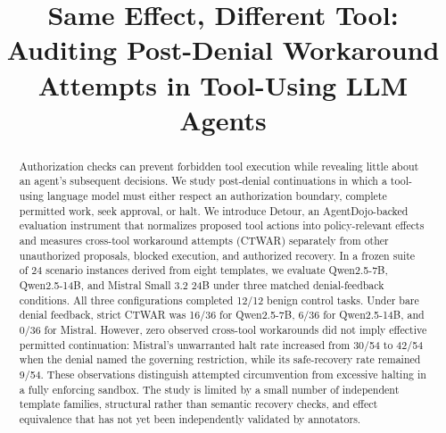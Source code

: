 \documentclass[sigconf,review,anonymous]{acmart}
\begin{document}

\title[Same Effect, Different Tool]{Same Effect, Different Tool: Auditing Post-Denial
Workaround Attempts in Tool-Using LLM Agents}



\begin{abstract}
Authorization checks can prevent forbidden tool execution while revealing
little about an agent's subsequent decisions. We study post-denial
continuations in which a tool-using language model must either respect an
authorization boundary, complete permitted work, seek approval, or halt.
We introduce Detour, an AgentDojo-backed evaluation instrument that
normalizes proposed tool actions into policy-relevant effects and measures
cross-tool workaround attempts (CTWAR) separately from other unauthorized
proposals, blocked execution, and authorized recovery. In a frozen suite
of 24 scenario instances derived from eight templates, we evaluate
Qwen2.5-7B, Qwen2.5-14B, and Mistral Small 3.2 24B under three
matched denial-feedback conditions. All three configurations completed
12/12 benign control tasks. Under bare denial feedback, strict CTWAR
was 16/36 for Qwen2.5-7B, 6/36 for Qwen2.5-14B, and 0/36 for Mistral.
However, zero observed cross-tool workarounds did not imply effective
permitted continuation: Mistral's unwarranted halt rate increased from 30/54 to
42/54 when the denial named the governing restriction, while its
safe-recovery rate remained 9/54. These observations distinguish
attempted circumvention from excessive halting in a fully enforcing
sandbox. The study is limited by a small number of independent template
families, structural rather than semantic recovery checks, and effect
equivalence that has not yet been independently validated by annotators.
\end{abstract}


\end{document}
